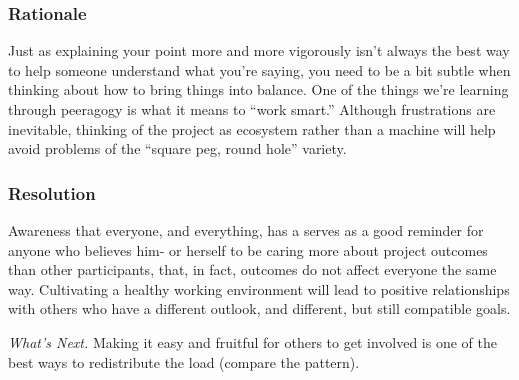 \subsubsection*{Rationale} Just as explaining your point more and more vigorously
isn't always the best way to help someone understand what you're
saying, you need to be a bit subtle when thinking about how to bring
things into balance.  One of the things we're learning through
peeragogy is what it means to ``work smart.''  Although frustrations
are inevitable, thinking of the project as ecosystem rather than a
machine will help avoid problems of the ``square peg, round hole''
variety.

\subsubsection*{Resolution}
Awareness that everyone, and everything, has a  serves as a good reminder for anyone who believes him- or
herself to be caring more about project outcomes than other
participants, that, in fact, outcomes do not affect everyone the same way.
Cultivating a healthy working environment will lead to positive relationships
with others who have a different outlook, and different, but still compatible goals.

\begin{framed}
\emph{What's Next.}
Making it easy
and fruitful for others to get involved is one of the best ways to
redistribute the load (compare the
pattern).
\end{framed}
\endgroup

    
    
    

    
    
    
    
    